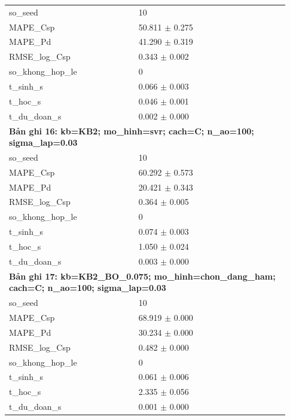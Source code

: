 \begin{longtable}{p{0.43\linewidth}p{0.50\linewidth}}
so\_\allowbreak seed & 10 \\
MAPE\_\allowbreak Csp & 50.811 $\pm$ 0.275 \\
MAPE\_\allowbreak Pd & 41.290 $\pm$ 0.319 \\
RMSE\_\allowbreak log\_\allowbreak Csp & 0.343 $\pm$ 0.002 \\
so\_\allowbreak khong\_\allowbreak hop\_\allowbreak le & 0 \\
t\_\allowbreak sinh\_\allowbreak s & 0.066 $\pm$ 0.003 \\
t\_\allowbreak hoc\_\allowbreak s & 0.046 $\pm$ 0.001 \\
t\_\allowbreak du\_\allowbreak doan\_\allowbreak s & 0.002 $\pm$ 0.000 \\
\midrule
\multicolumn{2}{p{0.95\linewidth}}{\textbf{Bản ghi 16: kb=KB2; mo\_hinh=svr; cach=C; n\_ao=100; sigma\_lap=0.03}} \\
so\_\allowbreak seed & 10 \\
MAPE\_\allowbreak Csp & 60.292 $\pm$ 0.573 \\
MAPE\_\allowbreak Pd & 20.421 $\pm$ 0.343 \\
RMSE\_\allowbreak log\_\allowbreak Csp & 0.364 $\pm$ 0.005 \\
so\_\allowbreak khong\_\allowbreak hop\_\allowbreak le & 0 \\
t\_\allowbreak sinh\_\allowbreak s & 0.074 $\pm$ 0.003 \\
t\_\allowbreak hoc\_\allowbreak s & 1.050 $\pm$ 0.024 \\
t\_\allowbreak du\_\allowbreak doan\_\allowbreak s & 0.003 $\pm$ 0.000 \\
\midrule
\multicolumn{2}{p{0.95\linewidth}}{\textbf{Bản ghi 17: kb=KB2\_BO\_0.075; mo\_hinh=chon\_dang\_ham; cach=C; n\_ao=100; sigma\_lap=0.03}} \\
so\_\allowbreak seed & 10 \\
MAPE\_\allowbreak Csp & 68.919 $\pm$ 0.000 \\
MAPE\_\allowbreak Pd & 30.234 $\pm$ 0.000 \\
RMSE\_\allowbreak log\_\allowbreak Csp & 0.482 $\pm$ 0.000 \\
so\_\allowbreak khong\_\allowbreak hop\_\allowbreak le & 0 \\
t\_\allowbreak sinh\_\allowbreak s & 0.061 $\pm$ 0.006 \\
t\_\allowbreak hoc\_\allowbreak s & 2.335 $\pm$ 0.056 \\
t\_\allowbreak du\_\allowbreak doan\_\allowbreak s & 0.001 $\pm$ 0.000 \\

\end{longtable}
